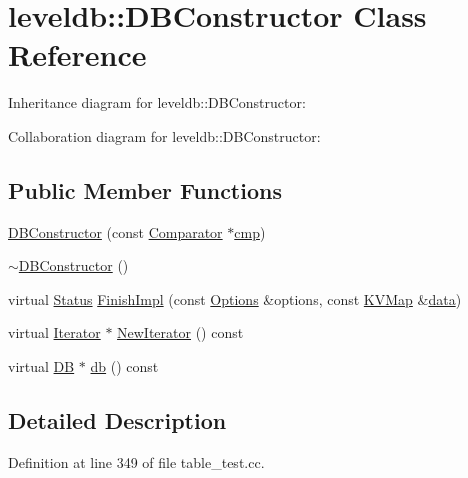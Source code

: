 \hypertarget{classleveldb_1_1_d_b_constructor}{}\section{leveldb\+:\+:D\+B\+Constructor Class Reference}
\label{classleveldb_1_1_d_b_constructor}


Inheritance diagram for leveldb\+:\+:D\+B\+Constructor\+:


Collaboration diagram for leveldb\+:\+:D\+B\+Constructor\+:
\subsection*{Public Member Functions}
\begin{DoxyCompactItemize}
\item 
\hyperlink{classleveldb_1_1_d_b_constructor_ae27ecdd7732629b08c25a63f82dfd4a9}{D\+B\+Constructor} (const \hyperlink{structleveldb_1_1_comparator}{Comparator} $\ast$\hyperlink{table__test_8cc_a87863e435922f0910ca8db43f02a6c0b}{cmp})
\item 
\hyperlink{classleveldb_1_1_d_b_constructor_a370a9584eadd852b375267f69fde241c}{$\sim$\+D\+B\+Constructor} ()
\item 
virtual \hyperlink{classleveldb_1_1_status}{Status} \hyperlink{classleveldb_1_1_d_b_constructor_a554d8e348d9135ff72a43a03c647c261}{Finish\+Impl} (const \hyperlink{structleveldb_1_1_options}{Options} \&options, const \hyperlink{namespaceleveldb_aac1e50450147be263e08252c6700f7a7}{K\+V\+Map} \&\hyperlink{classleveldb_1_1_constructor_a55a0363200d6e86d8beb3b15b75e3824}{data})
\item 
virtual \hyperlink{classleveldb_1_1_iterator}{Iterator} $\ast$ \hyperlink{classleveldb_1_1_d_b_constructor_a51936c1c2cb31fe26f5fb2a237cfdeec}{New\+Iterator} () const 
\item 
virtual \hyperlink{classleveldb_1_1_d_b}{D\+B} $\ast$ \hyperlink{classleveldb_1_1_d_b_constructor_a2bec14f01bb0fc459e0a09a70f06210d}{db} () const 
\end{DoxyCompactItemize}


\subsection{Detailed Description}


Definition at line 349 of file table\+\_\+test.\+cc.



